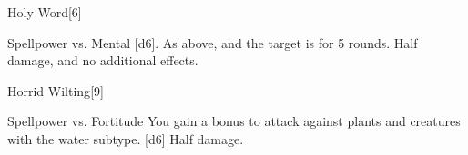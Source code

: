 \begin{spellsection}{Holy Word}[6]
    \begin{spellheader}
    \end{spellheader}
    \begin{spellcontent}
        \begin{spelltargetinginfo}
        \end{spelltargetinginfo}
        \begin{spelleffects}
            \begin{spellattack}{Spellpower vs. Mental}
                \spellsuccess {}[d6].
                \spellcritical As above, and the target is \dazed for 5 rounds.
                \spellfailure Half damage, and no additional effects.
            \end{spellattack}
        \end{spelleffects}
    \end{spellcontent}
    \begin{spellfooter}
        \miscastexplode
    \end{spellfooter}
\end{spellsection}

\begin{spellsection}{Horrid Wilting}[9]
    \begin{spellheader}
    \end{spellheader}
    \begin{spellcontent}
        \begin{spelltargetinginfo}
        \end{spelltargetinginfo}
        \begin{spelleffects}
            \begin{spellattack}{Spellpower vs. Fortitude}
                \spellspecial You gain a  bonus to attack against plants and creatures with the water subtype.
                \spellsuccess {}[d6]
                \spellfailure Half damage.
            \end{spellattack}
        \end{spelleffects}
    \end{spellcontent}
    \begin{spellfooter}
        \miscastyou
    \end{spellfooter}
\end{spellsection}

